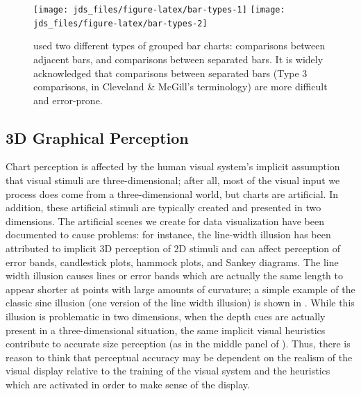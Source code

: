 \documentclass[letterpaper,inpress,dvipsnames]{jdsart}
\begin{document}
\begin{figure}
\texttt{[image: jds\_files/figure-latex/bar-types-1]} \texttt{[image: jds\_files/figure-latex/bar-types-2]} \caption{\citet{clevelandGraphical1984} used two different types of grouped bar charts: comparisons between adjacent bars, and comparisons between separated bars. It is widely acknowledged that comparisons between separated bars (Type 3 comparisons, in Cleveland \& McGill's terminology) are more difficult and error-prone.}\label{fig:bar-types}
\end{figure}

\hypertarget{d-graphical-perception}{%
\subsection{3D Graphical Perception}\label{d-graphical-perception}}

Chart perception is affected by the human visual system's implicit assumption that visual stimuli are three-dimensional; after all, most of the visual input we process does come from a three-dimensional world, but charts are artificial.
In addition, these artificial stimuli are typically created and presented in two dimensions.
The artificial scenes we create for data visualization have been documented to cause problems: for instance, the line-width illusion \citep{vanderplasSignsSineIllusion2015, daySineIllusion1991, hofmannCommonAnglePlots2013} has been attributed to implicit 3D perception of 2D stimuli and can affect perception of error bands, candlestick plots, hammock plots, and Sankey diagrams. The line width illusion causes lines or error bands which are actually the same length to appear shorter at points with large amounts of curvature; a simple example of the classic sine illusion (one version of the line width illusion) is shown in .
While this illusion is problematic in two dimensions, when the depth cues are actually present in a three-dimensional situation, the same implicit visual heuristics contribute to accurate size perception (as in the middle panel of ).
Thus, there is reason to think that perceptual accuracy may be dependent on the realism of the visual display relative to the training of the visual system and the heuristics which are activated in order to make sense of the display.
\end{document}
